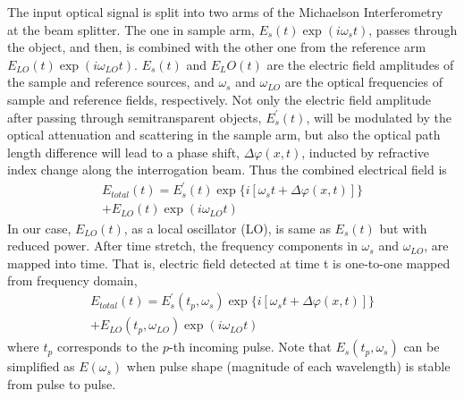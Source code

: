 \documentclass[aps,pra,reprint,superscriptaddress]{revtex4-1}
\begin{document}
The input optical signal is split into two arms of the Michaelson Interferometry at the beam splitter. The one in sample arm, $E_s(t)\exp(i\omega_s t)$, passes through the object, and then, is combined with the other one from the reference arm $E_{LO}(t)\exp(i\omega_{LO} t)$. $E_s(t)$ and $E_LO(t)$ are the electric field amplitudes of the sample and reference sources, and $\omega_s$ and $\omega_{LO}$ are the optical frequencies of sample and reference fields, respectively. Not only the electric field amplitude after passing through semitransparent objects, $E_s^\prime(t)$, will be modulated by the optical attenuation and scattering in the sample arm, but also the optical path length difference will lead to a phase shift, $\Delta\varphi(x,t)$, inducted by refractive index change along the interrogation beam. Thus the combined electrical field is
\begin{multline}
E_{total}(t) = E_s^\prime(t) \exp \lbrace i[\omega_s t+\Delta\varphi(x,t)] \rbrace\\
+ E_{LO}(t) \exp(i\omega_{LO} t)
\end{multline}
In our case, $E_{LO}(t)$, as a local oscillator (LO), is same as $E_s(t)$ but with reduced power. After time stretch, the frequency components in $\omega_s$ and $\omega_{LO}$, are mapped into time. That is, electric field detected at time t is one-to-one mapped from frequency domain,
\begin{multline}
E_{total}(t) = E_s^\prime(t_p,\omega_s) \exp \lbrace i[\omega_s t+\Delta\varphi(x,t)] \rbrace\\
+ E_{LO}(t_p,\omega_{LO}) \exp(i\omega_{LO} t)
\end{multline}
where $t_p$ corresponds to the $p$-th incoming pulse. Note that $E_s(t_p,\omega_s)$ can be simplified as $E(\omega_s)$ when pulse shape (magnitude of each wavelength) is stable from pulse to pulse.
\end{document}

